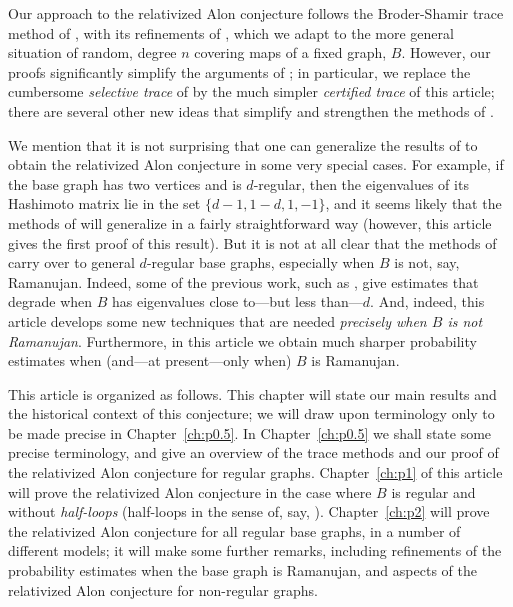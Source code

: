 \documentclass{memo-l}
\theoremstyle{plain}
\theoremstyle{definition}
\numberwithin{section}{chapter}
\numberwithin{equation}{chapter}
\theoremstyle{plain}
\theoremstyle{definition}
\begin{document}
Our approach to the relativized Alon conjecture
follows the Broder-Shamir trace method of \cite{broder},
with its refinements of \cite{friedman_random_graphs,friedman_alon},
which we adapt to the more general situation
of random, degree $n$ covering maps of a 
fixed graph, $B$.
However, our proofs significantly simplify the arguments
of \cite{friedman_alon}; in particular,
we replace the cumbersome {\em selective trace} of \cite{friedman_alon}
by the much simpler 
{\em certified trace} of this article; there are
several other new ideas that simplify and strengthen
the methods of \cite{friedman_alon}.

We mention that it is not surprising that one can generalize the
results of \cite{friedman_alon} to obtain the
relativized Alon conjecture in some very special cases.  For example,
if the base graph has two vertices and is $d$-regular, 
then the eigenvalues of its
Hashimoto matrix lie in the set $\{d-1,1-d,1,-1\}$, and it seems
likely that the methods of
\cite{friedman_alon} will generalize in a fairly straightforward way
(however, this article gives the first proof of this result).
But it is not at all clear that the methods of
\cite{friedman_alon} carry over to general $d$-regular base graphs, 
especially when $B$ is not, say, Ramanujan.  Indeed, some of the
previous work, such as \cite{lubetzky}, give estimates that degrade
when $B$ has eigenvalues close to---but less than---$d$.
And, indeed, this article develops some new techniques that are needed
{\em precisely when $B$ is not Ramanujan}.
Furthermore, in this article we obtain much sharper probability
estimates when (and---at present---only when) $B$ is Ramanujan.

This article is organized as follows.
This chapter will state our main results and the historical context
of this conjecture; we will draw upon terminology only to be made
precise in Chapter~\ref{ch:p0.5}.
In Chapter~\ref{ch:p0.5} we shall state some precise terminology,
and give an overview of the trace methods and our proof of the 
relativized Alon conjecture for regular graphs.
Chapter~\ref{ch:p1} of this article will prove the relativized Alon conjecture
in the case where $B$ is regular and without {\em half-loops} (half-loops
in the sense of,
say, \cite{friedman_geometric_aspects}).
Chapter~\ref{ch:p2} will prove the relativized Alon conjecture
for all regular base graphs, in a number of different models;
it will make some further remarks, including refinements of the
probability estimates when the
base graph is Ramanujan, and aspects of the relativized Alon
conjecture for non-regular graphs.
\end{document}
